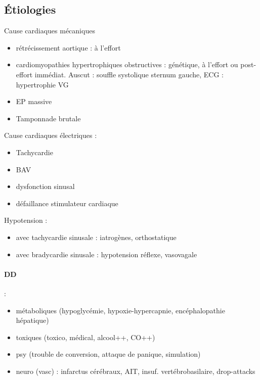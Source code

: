 \subsection{Étiologies}
Cause cardiaques mécaniques
\begin{itemize}
  \item rétrécissement aortique : à l'effort
  \item cardiomyopathies hypertrophiques obstructives : génétique, à l'effort ou
    post-effort immédiat. Auscut : souffle systolique sternum gauche, ECG :
    hypertrophie VG
  \item EP massive
  \item Tamponnade brutale
\end{itemize}

Cause cardiaques électriques :
\begin{itemize}
  \item Tachycardie
  \item BAV
  \item dysfonction sinusal
  \item défaillance stimulateur cardiaque
\end{itemize}

Hypotension :
\begin{itemize}
  \item avec tachycardie sinusale : iatrogènes, orthostatique
  \item avec bradycardie sinusale : hypotension réflexe, vasovagale
\end{itemize}

\paragraph{DD} : 
\begin{itemize}
  \item métaboliques (hypoglycémie, hypoxie-hypercapnie,
encéphalopathie hépatique)
\item toxiques (toxico, médical, alcool++, CO++)
\item psy (trouble de conversion, attaque de panique, simulation)
\item neuro (vasc) : infarctus cérébraux, AIT, insuf. vertébrobasilaire,
  drop-attacks
\end{itemize}

